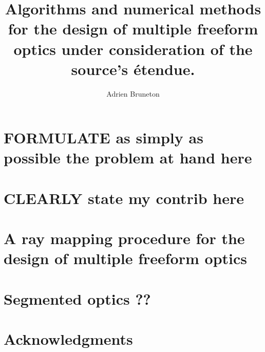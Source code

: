 \documentclass[10pt,a4paper,draft]{book}
\author{Adrien Bruneton}
\title{Algorithms and numerical methods for the design of multiple freeform optics
under consideration of the source's étendue.}
\numberwithin{equation}{section}
\numberwithin{figure}{section}
\begin{document}
\maketitle
\tableofcontents



\chapter{FORMULATE as simply as possible the problem at hand here}



\chapter{CLEARLY state my contrib here}

\chapter{A ray mapping procedure for the design of multiple freeform optics}
\label{ch:core}










% 
\chapter{Segmented optics ??}



\chapter{Acknowledgments}

%


\end{document}
